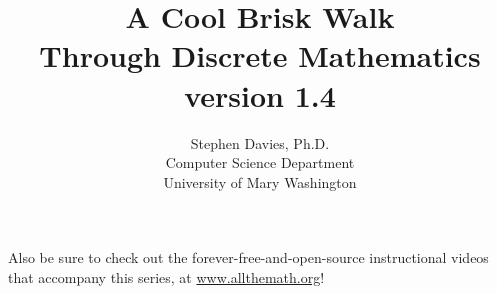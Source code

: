 \documentclass[11pt]{memoir}
\begin{document}
\title{A Cool Brisk Walk\\Through Discrete Mathematics\\{\small version
1.4}}
\author{Stephen Davies, Ph.D.\\Computer Science Department\\University of Mary Washington}
\date{}
\maketitle


\frontmatter

\pagebreak

\renewcommand{\contentsname}{Contents at a glance}
\setcounter{tocdepth}{0}
\tableofcontents

\vspace{.6in}
\begin{center}
\small
Also be sure to check out the forever-free-and-open-source instructional videos
that accompany this series, at \url{www.allthemath.org}!
\end{center}



\mainmatter













\backmatter
\printindex
\end{document}
